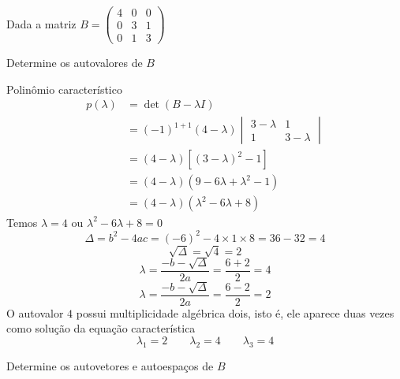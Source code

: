 \documentclass[a4paper,12pt,fleqn]{article}
\begin{document}

\bigskip
Dada a matriz
\(
  B = \begin{pmatrix}
    4 & 0 & 0 \\
    0 & 3 & 1 \\
    0 & 1 & 3
  \end{pmatrix}
\)

Determine os autovalores de $B$

\begin{answer}
  Polinômio característico
  \begin{align*}
    p(\lambda)
    & = \det(B-\lambda I) \\
    & = (-1)^{1+1}(4-\lambda)
        \begin{vmatrix}
          3-\lambda & 1         \\
          1         & 3-\lambda
        \end{vmatrix}\\
    & = (4-\lambda) \left[(3-\lambda)^2-1\right] \\
    & = (4-\lambda)(9-6\lambda +\lambda^2 - 1) \\
    & = (4-\lambda)(\lambda^2 - 6\lambda + 8)
  \end{align*}
  Temos \(\lambda=4\) ou \(\lambda^2 - 6\lambda + 8=0\)
  \[
    \Delta
    = b^2 - 4ac
    = (-6)^2 - 4 \times 1 \times 8
    = 36 - 32
    = 4
  \]
  \[
    \sqrt{\Delta} = \sqrt{4} = 2
  \]
  \[
    \lambda
    = \frac{-b - \sqrt{\Delta}}{2a}
    = \frac{6+2}{2}
    = 4
  \]
  \[
    \lambda
    = \frac{-b - \sqrt{\Delta}}{2a}
    = \frac{6-2}{2}
    = 2
  \]
  O autovalor $4$ possui multiplicidade algébrica dois, isto é,
  ele aparece duas vezes como solução da equação característica
  \[
    \lambda_1 = 2 \qquad
    \lambda_2 = 4 \qquad
    \lambda_3 = 4
  \]
\end{answer}

Determine os autovetores e autoespaços de $B$
\end{document}
